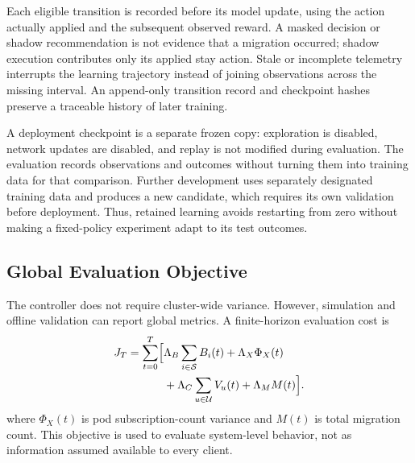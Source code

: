 \documentclass[manuscript]{acmart}
\begin{document}
Each eligible transition is recorded before its model update, using the
action actually applied and the subsequent observed reward. A masked decision
or shadow recommendation is not evidence that a migration occurred; shadow
execution contributes only its applied stay action. Stale or incomplete
telemetry interrupts the learning trajectory instead of joining observations
across the missing interval. An append-only transition record and checkpoint
hashes preserve a traceable history of later training.

A deployment checkpoint is a separate frozen copy: exploration is disabled,
network updates are disabled, and replay is not modified during evaluation.
The evaluation records observations and outcomes without turning them into
training data for that comparison. Further development uses separately
designated training data and produces a new candidate, which requires its own
validation before deployment. Thus, retained learning avoids restarting from
zero without making a fixed-policy experiment adapt to its test outcomes.

\subsection{Global Evaluation Objective}

The controller does not require cluster-wide variance. However, simulation and
offline validation can report global metrics. A finite-horizon evaluation cost
is
\begin{align}
	J_T =
	\sum_{t=0}^{T}
	\Bigl[
	&\Lambda_B \sum_{i\in\mathcal{S}}B_i(t)
	+\Lambda_X \Phi_X(t) \nonumber\\
	&+\Lambda_C \sum_{u\in\mathcal{U}}V_u(t)
	+\Lambda_M M(t)
	\Bigr].
\end{align}
where $\Phi_X(t)$ is pod subscription-count variance and $M(t)$ is total
migration count. This objective is used to evaluate system-level behavior, not
as information assumed available to every client.
\end{document}
